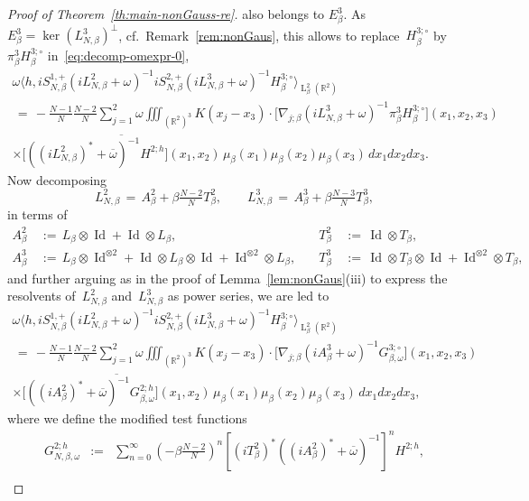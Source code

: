 \documentclass[a4paper,11pt,reqno,noindent]{amsart}
\theoremstyle{plain}
\numberwithin{equation}{section}
\newcommand{\R}{\mathbb R}
\newcommand{\Id}{\operatorname{Id}}
\newcommand{\3}{|\!|\!|}
\newcommand{\Ld}{\operatorname{L}}
\begin{document}
\begin{proof}[Proof of Theorem~\ref{th:main-nonGauss-re}]
also belongs to $E^3_\beta$. As $E^3_\beta=\ker(L_{N,\beta}^3)^\bot$, cf.~Remark~\ref{rem:nonGaus}, this allows to replace~$H^{3;\circ}_\beta$ by~$\pi_\beta^3H^{3;\circ}_\beta$ in~\eqref{eq:decomp-omexpr-0},
\begin{multline*}
\omega \Big\langle h,iS_{N,\beta}^{1,+}(iL_{N,\beta}^2+\omega)^{-1}iS_{N,\beta}^{2,+}(iL_{N,\beta}^3+\omega)^{-1}H_\beta^{3;\circ}\Big\rangle_{\Ld^2_\beta(\R^2)}\\
\,=\,-\tfrac{N-1}N\tfrac{N-2}N\sum_{j=1}^2\omega\iiint_{(\R^2)^3} K(x_j-x_3)\cdot\big[\nabla_{j;\beta}(iL_{N,\beta}^3+\omega)^{-1}\pi_\beta^3H_\beta^{3;\circ}\big](x_1,x_2,x_3)\\
\times \overline{\big[((iL_{N,\beta}^2)^*+\overline\omega)^{-1}H^{2;h}\big](x_1,x_2)}\,\mu_\beta(x_1)\mu_\beta(x_2)\mu_\beta(x_3)\,dx_1dx_2dx_3.
\end{multline*}
Now decomposing
\[L_{N,\beta}^2\,=\,A_{\beta}^{2}+\beta \tfrac{N-2}NT_\beta^{2},\qquad L_{N,\beta}^3\,=\,A_{\beta}^{3}+\beta \tfrac{N-3}NT_\beta^{3},\]
in terms of
\begin{equation*}\begin{array}{rlrl}
A_{\beta}^{2}\,&:=\,L_\beta\otimes\Id+\Id\otimes L_\beta,\quad &T_\beta^2\,&:=\,\Id\otimes T_\beta,\\
A_{\beta}^{3}\,&:=\,L_\beta\otimes\Id^{\otimes2}+\Id\otimes L_\beta\otimes\Id+\Id^{\otimes2}\otimes L_\beta,\quad &T_\beta^3\,&:=\,\Id\otimes T_\beta\otimes\Id+\Id^{\otimes2}\otimes T_\beta,
\end{array}
\end{equation*}
and further arguing as in the proof of Lemma~\ref{lem:nonGaus}(iii) to express the resolvents of~$L^2_{N,\beta}$ and~$L^3_{N,\beta}$ as power series, we are led to
\begin{multline*}
\omega \Big\langle h,iS_{N,\beta}^{1,+}(iL_{N,\beta}^2+\omega)^{-1}iS_{N,\beta}^{2,+}(iL_{N,\beta}^3+\omega)^{-1}H_\beta^{3;\circ}\Big\rangle_{\Ld^2_\beta(\R^2)}\\
\,=\,-\tfrac{N-1}N\tfrac{N-2}N\sum_{j=1}^2\omega\iiint_{(\R^2)^3} {K(x_j-x_3)\cdot\big[\nabla_{j;\beta}}(iA_{\beta}^3+\omega)^{-1}G^{3;\circ}_{\beta,\omega}\big](x_1,x_2,x_3)\\
\times \overline{\big[((iA_{\beta}^2)^*+\overline\omega)^{-1}G^{2;h}_{\beta,\omega}\big](x_1,x_2)}\,\mu_\beta(x_1)\mu_\beta(x_2)\mu_\beta(x_3)\,dx_1dx_2dx_3,
\end{multline*}
where we define the modified test functions
\begin{eqnarray*}
G^{2;h}_{N,\beta,\omega}&:=&\sum_{n=0}^\infty(-\beta\tfrac{N-2}N)^n{[(iT_\beta^2)^*((iA_\beta^2)^*+\overline\omega)^{-1}]^nH^{2;h}},\\

\end{eqnarray*}
\end{proof}
\end{document}
